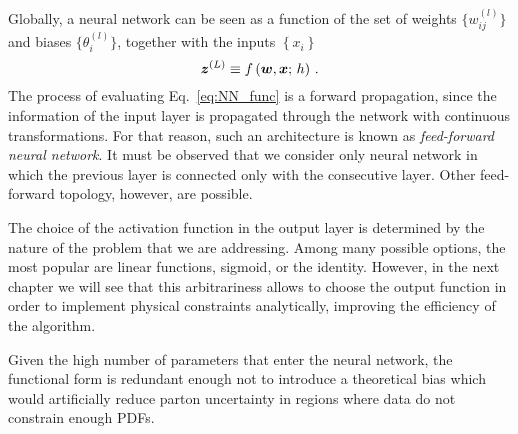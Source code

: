 Globally, a neural network can be seen as a function of the set of weights $\{ w^{(l)}_{ij} \}$ and biases $\{ \theta_{i}^{(l)} \}$, together with the inputs $\left\{  x_i\right\}$
\begin{equation}
  \vb*{z}^{(L)} \equiv f \left( \vb*{w}, \vb*{x}; \, h \right) \,.
  \label{eq:NN_func}
\end{equation}
The process of evaluating Eq.~\eqref{eq:NN_func} is a forward propagation, since the information of the input layer is propagated through the network with continuous transformations. For that reason, such an architecture is known as \textit{feed-forward neural network}. It must be observed that we consider only neural network in which the previous layer is connected only with the consecutive layer. Other feed-forward topology, however, are possible.\par
The choice of the activation function in the output layer is determined by the nature of the problem that we are addressing. Among many possible options, the most popular are linear functions, sigmoid, or the identity. However, in the next chapter we will see that this arbitrariness allows to choose the output function in order to implement physical constraints analytically, improving the efficiency of the algorithm.\par
Given the high number of parameters that enter the neural network, the functional form is redundant enough not to introduce a theoretical bias which would artificially reduce parton uncertainty in regions where data do not constrain enough PDFs.


